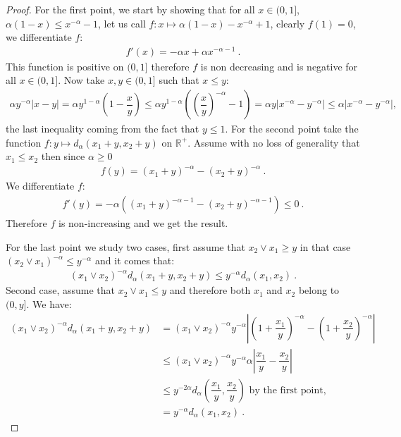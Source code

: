\documentclass[11pt,a4paper]{article}
\newcommand{\RR}{\mathbb{R}}
\begin{document}
\begin{proof}
    For the first point, we start by showing that for all $x \in (0,1]$, $\alpha(1-x) \leq x^{-\alpha} - 1$, let us call $f : x\mapsto \alpha(1-x) -x^{-\alpha} + 1$, clearly $f(1) = 0$, we differentiate $f$:
    \begin{align*}
        f'(x) = -\alpha x +  \alpha x^{-\alpha - 1}\ .
    \end{align*}
    This function is positive on $(0,1]$ therefore $f$ is non decreasing and is negative for all $x\in (0,1]$. Now take $x,y \in (0,1]$ such that $x \leq y$:
    \begin{align*}
        \alpha y^{-\alpha }|x - y| = \alpha y^{1-\alpha } \left(1 - \dfrac{x}{y}\right) \leq \alpha y^{1-\alpha } \left(\left(\dfrac{x}{y}\right)^{-\alpha} - 1 \right) = 
        \alpha y \left|x^{-\alpha} - y^{-\alpha}\right| \leq \alpha \left|x^{-\alpha} - y^{-\alpha}\right|,
    \end{align*}
    the last inequality coming from the fact that $y \leq 1$. For the second point take the function $f : y \mapsto d_\alpha(x_1 + y,x_2 + y)$ on $\RR^+$. Assume with no loss of generality that $x_1 \leq x_2$ then since $\alpha \geq 0$
    \begin{align*}
        f(y) = (x_1 + y)^{-\alpha} - (x_2 + y)^{-\alpha}\ .
    \end{align*}
    We differentiate $f$:
    \begin{align*}
        f'(y) = -\alpha((x_1 + y)^{-\alpha-1} - (x_2 + y)^{-\alpha-1}) \leq 0\ .
    \end{align*}
    Therefore $f$ is non-increasing and we get the result.
    
    For the last point we study two cases, first assume that $x_2\vee x_1 \geq y$ in that case $(x_2\vee x_1)^{-\alpha} \leq y^{-\alpha}$ and it comes that:
    \begin{align*}
        (x_1 \vee x_2)^{-\alpha} d_\alpha(x_1 + y,x_2 + y) \leq y^{-\alpha} d_\alpha(x_1,x_2)\ .
    \end{align*}
    Second case, assume that $x_2\vee x_1 \leq y$ and therefore both $x_1$ and $x_2$ belong to $(0,y]$. We have:
    \begin{align*}
        (x_1\vee x_2)^{-\alpha}d_\alpha(x_1 + y,x_2 + y) &= (x_1\vee x_2)^{-\alpha}y^{-\alpha} \left|\left(1 + \dfrac{x_1}{y}\right)^{-\alpha} - \left(1 + \dfrac{x_2}{y}\right)^{-\alpha} \right| \\
        &\leq (x_1\vee x_2)^{-\alpha}y^{-\alpha}\alpha \left|\dfrac{x_1}{y} - \dfrac{x_2}{y} \right|\\
        &\leq y^{-2\alpha}d_\alpha\left(\dfrac{x_1}{y},\dfrac{x_2}{y}\right) \text{ by the first point,}\\
        &= y^{-\alpha} d_\alpha(x_1,x_2)\ .
    \end{align*}
\end{proof}
\end{document}
